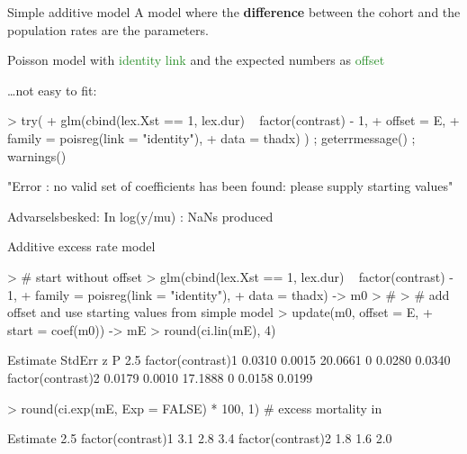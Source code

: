 \begin{frame}[fragile]{Simple additive model}
A model where the \textbf{difference} between the cohort and the
population rates are the parameters.

\pause
Poisson model with \textcolor{forestgreen}{identity link}
and the expected numbers as \textcolor{forestgreen}{offset}

\pause
\ldots not easy to fit:
\begin{Schunk}
\begin{Sinput}
> try(
+ glm(cbind(lex.Xst == 1, lex.dur) ~ factor(contrast) - 1,
+     offset = E,
+     family = poisreg(link = "identity"),
+     data = thadx) ) ; geterrmessage() ; warnings()
\end{Sinput}
\begin{Soutput}
[1] "Error : no valid set of coefficients has been found: please supply starting values\n"
\end{Soutput}
\begin{Soutput}
Advarselsbesked:
In log(y/mu) : NaNs produced
\end{Soutput}
\end{Schunk}
\end{frame}

\begin{frame}[fragile]{Additive excess rate model}
\begin{Schunk}
\begin{Sinput}
> # start without offset
> glm(cbind(lex.Xst == 1, lex.dur) ~ factor(contrast) - 1,
+     family = poisreg(link = "identity"),
+       data = thadx) -> m0
> #
> # add offset and use starting values from simple model
> update(m0, offset = E,
+             start = coef(m0)) -> mE
> round(ci.lin(mE), 4)
\end{Sinput}
\begin{Soutput}
                  Estimate StdErr       z P   2.5%
factor(contrast)1   0.0310 0.0015 20.0661 0 0.0280 0.0340
factor(contrast)2   0.0179 0.0010 17.1888 0 0.0158 0.0199
\end{Soutput}
\begin{Sinput}
> round(ci.exp(mE, Exp = FALSE) * 100, 1) # excess mortality in %
\end{Sinput}
\begin{Soutput}
                  Estimate 2.5%
factor(contrast)1      3.1  2.8   3.4
factor(contrast)2      1.8  1.6   2.0
\end{Soutput}
\end{Schunk}
\end{frame}

